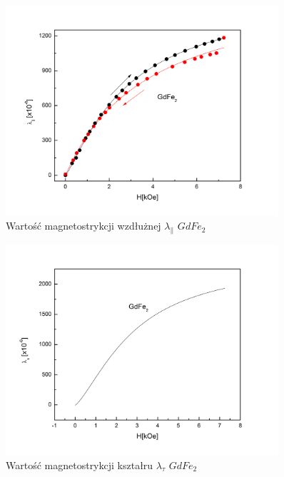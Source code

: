 \documentclass[a4paper,12pt]{article}
\numberwithin{equation}{section}
\begin{document}
\begin{figure}[h]
    \centering
    \includegraphics[width =0.9\textwidth]{../img/magneto/Gdwzdluzna}
    \caption{Wartość magnetostrykcji wzdłużnej $\lambda_{\parallel}$ $GdFe_2$}
    \label{Gdwzdluzna}
\end{figure}

\begin{figure}[h]
    \centering
    \includegraphics[width =0.9\textwidth]{../img/magneto/GdKsztaltu}
    \caption{Wartość magnetostrykcji kształru $\lambda_{\tau}$ $GdFe_2$}
    \label{GdKsztaltu}
\end{figure}
\end{document}
